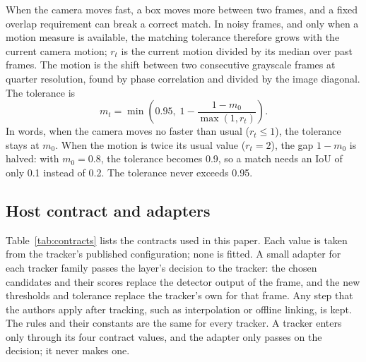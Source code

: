\documentclass[pdflatex,referee,sn-mathphys-num]{sn-jnl}
\begin{document}
When the camera moves fast, a box moves more between two frames, and a fixed
overlap requirement can break a correct match. In noisy frames, and only when
a motion measure is available, the matching tolerance therefore grows with
the current camera motion; $r_t$ is the current motion divided by its median
over past frames. The motion is the shift between two consecutive grayscale
frames at quarter resolution, found by phase correlation
\cite{reddy1996phasecorr} and divided by the image diagonal. The tolerance is
\begin{equation}
m_t=\min\!\left(0.95,\;1-\frac{1-m_0}{\max(1,r_t)}\right).
\label{eq:motion}
\end{equation}
In words, when the camera moves no faster than usual ($r_t\le1$), the
tolerance stays at $m_0$. When the motion is twice its usual value
($r_t=2$), the gap $1-m_0$ is halved: with $m_0=0.8$, the tolerance becomes
0.9, so a match needs an IoU of only 0.1 instead of 0.2. The tolerance never
exceeds 0.95.

\subsection{Host contract and adapters}\label{sec:contract}
Table~\ref{tab:contracts} lists the contracts used in this paper. Each value
is taken from the tracker's published configuration; none is fitted. A small
adapter for each tracker family passes the layer's decision to the tracker:
the chosen candidates and their scores replace the detector output of the
frame, and the new thresholds and tolerance replace the tracker's own for
that frame. Any step that the authors apply after tracking, such as
interpolation or offline linking, is kept. The rules and their constants are
the same for every tracker. A tracker enters only through its four contract
values, and the adapter only passes on the decision; it never makes one.
\end{document}
